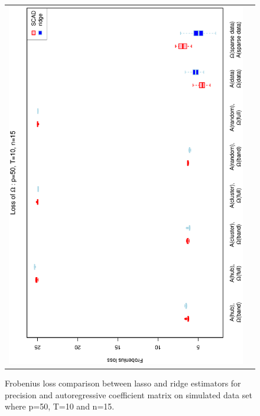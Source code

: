 \documentclass[a4paper]{article}
\begin{document}
\begin{figure}[h!]
\begin{tabular}{cc}
\includegraphics[scale=0.5,angle=270]{LossOmega50T10N15.eps}\\
\end{tabular}
\caption{Frobenius loss comparison between lasso and ridge estimators for precision and autoregressive coefficient matrix on simulated data set where p=50, T=10 and n=15.}
\label{fig:Loss50T20N5}
\end{figure}

\end{document}
